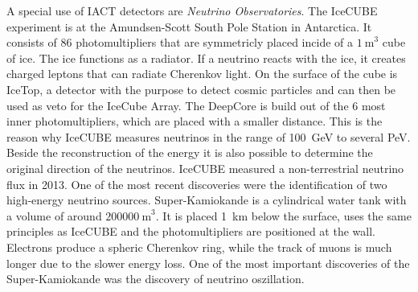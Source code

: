 A special use of IACT detectors are \textit{Neutrino Observatories}. The IceCUBE experiment is at the Amundsen-Scott South Pole Station in Antarctica. It consists of 86 photomultipliers that are symmetricly placed incide of a $\SI{1}{\meter}^3$ cube of ice. The ice functions as a radiator. If a neutrino reacts with the ice, it creates charged leptons that can radiate Cherenkov light. On the surface of the cube is IceTop, a detector with the purpose to detect cosmic particles and can then be used as veto for the IceCube Array. The DeepCore is build out of the 6 most inner photomultipliers, which are placed with a smaller distance. This is the reason why IceCUBE measures neutrinos in the range of \SI{100}{\giga\electronvolt} to several \si{\peta\electronvolt}. Beside the reconstruction of the energy it is also possible to determine the original direction of the neutrinos. IceCUBE measured a non-terrestrial neutrino flux in 2013. One of the most recent discoveries were the identification of two high-energy neutrino sources. Super-Kamiokande is a cylindrical water tank with a volume of around $\SI{200000}{\meter}^3$. It is placed \SI{1}{\kilo\meter} below the surface, uses the same principles as IceCUBE and the photomultipliers are positioned at the wall. Electrons produce a spheric Cherenkov ring, while the track of muons is much longer due to the slower energy loss. One of the most important discoveries of the Super-Kamiokande was the discovery of neutrino oszillation.
